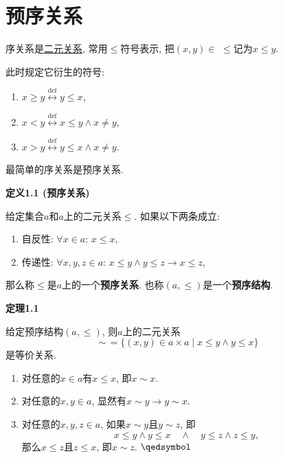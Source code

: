 


\setlength{\abovedisplayskip}{1pt}
\setlength{\belowdisplayskip}{1pt}

\section{预序关系}

序关系是\href{../../02 集合的一般构造/02 二元关系#nameddest=sec:定义1.1}{二元关系},
常用$\leqslant$符号表示, 把$(x,y)\in\,\,\leqslant$记为$x\leqslant y$.

此时规定它衍生的符号:
\begin{enumerate}
    \item $x\geqslant y\overset{\mathrm{def}}{\leftrightarrow}y\leqslant x$,
    \item $x<y\overset{\mathrm{def}}{\leftrightarrow}x\leqslant y\land x\neq y$,
    \item $x>y\overset{\mathrm{def}}{\leftrightarrow}y\leqslant x\land x\neq y$.
\end{enumerate}

\vspace{10pt}

最简单的序关系是预序关系.

\vspace{10pt}

\hypertarget{sec:定义1.1}{}
\noindent\textbf{定义1.1 (预序关系)}

给定集合$a$和$a$上的二元关系$\leqslant$. 如果以下两条成立:
\begin{enumerate}
    \item 自反性: $\forall x\in a:\,x\leqslant x$,
    \item 传递性: $\forall x,y,z\in a:\,
    x\leqslant y\land y\leqslant z\to x\leqslant z$,
\end{enumerate}
那么称$\leqslant$是$a$上的一个\textbf{预序关系}.
也称$(a,\leqslant)$是一个\textbf{预序结构}.

\vspace{10pt}

\hypertarget{sec:定理1.1}{}
\noindent\textbf{定理1.1}

给定预序结构$(a,\leqslant)$, 则$a$上的二元关系
\[
    \sim\,=\{(x,y)\in a\times a\mid x\leqslant y\land y\leqslant x\}
\]
是等价关系.


\begin{enumerate}
    \item 对任意的$x\in a$有$x\leqslant x$, 即$x\sim x$.
    \item 对任意的$x,y\in a$, 显然有$x\sim y\to y\sim x$.
    \item 对任意的$x,y,z\in a$, 如果$x\sim y$且$y\sim z$, 即
    \[
        x\leqslant y\land y\leqslant x\quad\land\quad
        y\leqslant z\land z\leqslant y,
    \]
    那么$x\leqslant z$且$z\leqslant x$, 即$x\sim z$. \hfill $\qedsymbol$
\end{enumerate}

